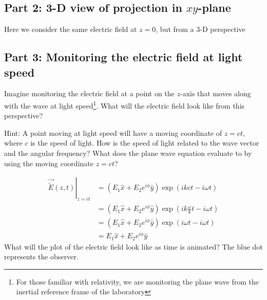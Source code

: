 \documentclass{article}
\begin{document}
\subsection{Part 2: 3-D view of projection in $xy$-plane}
Here we consider the same electric field at $z=0$, but from a 3-D perspective

\subsection{Part 3: Monitoring the electric field at light speed}
Imagine monitoring the electric field at a point on the $z$-axis that moves along with the wave at light speed\footnote{For those familiar with relativity, we are monitoring the plane wave from the inertial reference frame of the laboratory}.  What will the electric field look like from this perspective?

Hint: A point moving at light speed will have a moving coordinate of $z=ct$, where $c$ is the speed of light.  How is the speed of light related to the wave vector and the angular frequency?  What does the plane wave equation evaluate to by using the moving coordinate $z=ct$?

\begin{align}
     \left.\vec{\widetilde{E}}\left(z,t\right)\right\rvert_{z=ct} &= \left(E_1\hat{x} + E_2e^{i\phi}\hat{y}\right) \exp \left(ikct- i \omega t\right)  \\
     &= \left(E_1\hat{x} + E_2e^{i\phi}\hat{y}\right) \exp \left(ik\frac{\omega}{k}t - i \omega t\right) \\
     &= \left(E_1\hat{x} + E_2e^{i\phi}\hat{y}\right) \exp \left(i\omega t- i \omega t\right)   \\
     &= E_1\hat{x} + E_2e^{i\phi}\hat{y} 
\end{align}
What will the plot of the electric field look like as time is animated?  The blue dot represents the observer.
\end{document}
